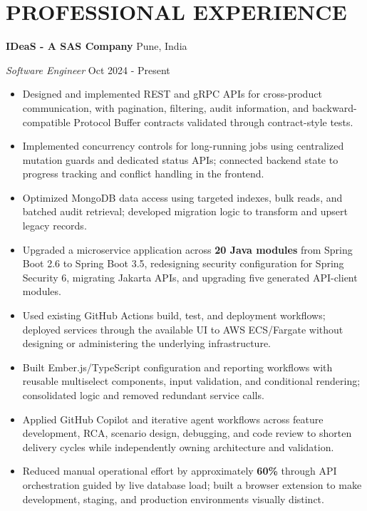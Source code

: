 \documentclass[a4paper,10pt]{article}
\begin{document}
\section{PROFESSIONAL EXPERIENCE}
\textbf{IDeaS - A SAS Company} \hfill Pune, India\par
\textit{Software Engineer} \hfill Oct 2024 - Present\par
\begin{itemize}
\item Designed and implemented REST and gRPC APIs for cross-product communication, with pagination, filtering, audit information, and backward-compatible Protocol Buffer contracts validated through contract-style tests.
\item Implemented concurrency controls for long-running jobs using centralized mutation guards and dedicated status APIs; connected backend state to progress tracking and conflict handling in the frontend.
\item Optimized MongoDB data access using targeted indexes, bulk reads, and batched audit retrieval; developed migration logic to transform and upsert legacy records.
\item Upgraded a microservice application across \textbf{20 Java modules} from Spring Boot 2.6 to Spring Boot 3.5, redesigning security configuration for Spring Security 6, migrating Jakarta APIs, and upgrading five generated API-client modules.
\item Used existing GitHub Actions build, test, and deployment workflows; deployed services through the available UI to AWS ECS/Fargate without designing or administering the underlying infrastructure.
\item Built Ember.js/TypeScript configuration and reporting workflows with reusable multiselect components, input validation, and conditional rendering; consolidated logic and removed redundant service calls.
\item Applied GitHub Copilot and iterative agent workflows across feature development, RCA, scenario design, debugging, and code review to shorten delivery cycles while independently owning architecture and validation.
\item Reduced manual operational effort by approximately \textbf{60\%} through API orchestration guided by live database load; built a browser extension to make development, staging, and production environments visually distinct.
\end{itemize}
\end{document}
